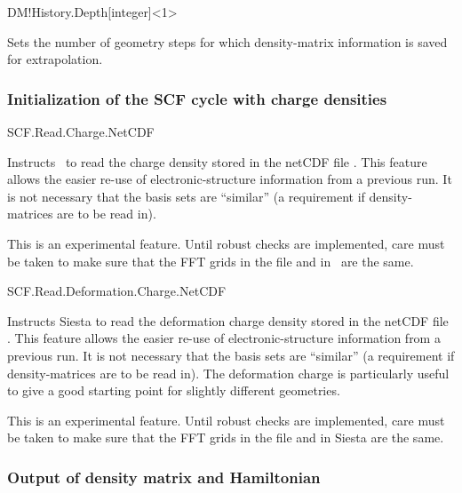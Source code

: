 \begin{fdfentry}{DM!History.Depth}[integer]<1>

  Sets the number of geometry steps for which density-matrix information
  is saved for extrapolation.
  
\end{fdfentry}



\subsubsection{Initialization of the SCF cycle with charge densities}


\begin{fdflogicalF}{SCF.Read.Charge.NetCDF}

  Instructs \siesta\ to read the charge density stored in the netCDF
  file . This feature allows the easier re-use of
  electronic-structure information from a previous run. It is not
  necessary that the basis sets are ``similar'' (a requirement if
  density-matrices are to be read in).

  \note This is an experimental feature. Until robust checks are
  implemented, care must be taken to make sure that the FFT grids in
  the  file and in \siesta\ are the same.

\end{fdflogicalF}


\begin{fdflogicalF}{SCF.Read.Deformation.Charge.NetCDF}
  
  Instructs Siesta to read the deformation charge density stored in
  the netCDF file . This feature allows the
  easier re-use of electronic-structure information from a previous
  run. It is not necessary that the basis sets are ``similar'' (a
  requirement if density-matrices are to be read in). The deformation
  charge is particularly useful to give a good starting point for
  slightly different geometries.

  \note This is an experimental feature. Until robust checks are
  implemented, care must be taken to make sure that the FFT grids in
  the  file and in Siesta are the same.

\end{fdflogicalF}


\subsubsection{Output of density matrix and Hamiltonian}

